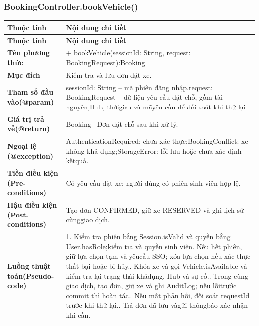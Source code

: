 \subsubsection{BookingController.bookVehicle()}
\begin{longtable}{|L{0.24\textwidth}|L{0.70\textwidth}|}
\hline
\textbf{Thuộc tính} & \textbf{Nội dung chi tiết} \\
\hline
\endfirsthead
\hline
\textbf{Thuộc tính} & \textbf{Nội dung chi tiết} \\
\hline
\endhead
\textbf{Tên phương thức} & + bookVehicle(sessionId: String, request: BookingRequest):\newline Booking \\
\hline
\textbf{Mục đích} & Kiểm tra và lưu đơn đặt xe. \\
\hline
\textbf{Tham số đầu vào}\newline \textbf{(@param)} & sessionId: String – mã phiên đăng nhập.\newline request: BookingRequest – dữ liệu yêu cầu đặt chỗ, gồm tài nguyên,\newline Hub, thờigian và mãyêu cầu để đối soát khi thử lại. \\
\hline
\textbf{Giá trị trả về(@return)} & Booking– Đơn đặt chỗ sau khi xử lý. \\
\hline
\textbf{Ngoại lệ (@exception)} & AuthenticationRequired: chưa xác thực;\newline BookingConflict: xe không khả dụng;\newline StorageError: lỗi lưu hoặc chưa xác định kếtquả. \\
\hline
\textbf{Tiền điều kiện (Pre-}\newline \textbf{conditions)} & Có yêu cầu đặt xe; người dùng có phiên sinh viên hợp lệ. \\
\hline
\textbf{Hậu điều kiện (Post-}\newline \textbf{conditions)} & Tạo đơn CONFIRMED, giữ xe RESERVED và ghi lịch sử cùng\newline giao dịch. \\
\hline
\textbf{Luồng thuật toán}\newline \textbf{(Pseudo-code)} & 1. Kiểm tra phiên bằng Session.isValid và quyền bằng User.hasRole;\newline kiểm tra và quyền sinh viên. Nếu hết phiên, giữ lựa chọn tạm và yêu\newline cầu SSO; xóa lựa chọn nếu xác thực thất bại hoặc bị hủy.. Khóa xe và gọi Vehicle.isAvailable và kiểm tra lại trạng thái khả\newline dụng, Hub và sự cố.. Trong cùng giao dịch, tạo đơn, giữ xe và ghi AuditLog; nếu lỗi\newline trước commit thì hoàn tác.. Nếu mất phản hồi, đối soát requestId trước khi thử lại.. Trả đơn đã lưu vàgửi thôngbáo xác nhận khi cần. \\
\hline
\end{longtable}
\vspace{-0.5\baselineskip}
